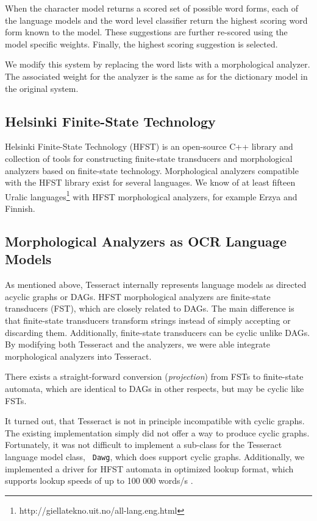 \documentclass[b5paper]{article}
\begin{document}
When the character model returns a scored set of possible word forms,
each of the language models and the word level classifier return the
highest scoring word form known to the model. These suggestions are
further re-scored using the model specific weights. Finally, the highest
scoring suggestion is selected.

We modify this system by replacing the word lists with a morphological
analyzer. The associated weight for the analyzer is the same as for
the dictionary model in the original system.

\subsection{Helsinki Finite-State Technology}
Helsinki Finite-State Technology (HFST) \cite{linden13} is an
open-source C++ library and collection of tools for constructing
finite-state transducers and morphological analyzers based on
finite-state technology. Morphological analyzers compatible with the
HFST library exist for several languages. We know of at least fifteen
Uralic languages\footnote{http://giellatekno.uit.no/all-lang.eng.html}
with HFST morphological analyzers, for example Erzya and Finnish.

\subsection{Morphological Analyzers as OCR Language Models}
As mentioned above, Tesseract internally represents language models as
directed acyclic graphs or DAGs. HFST morphological analyzers are
finite-state transducers (FST), which are closely related to DAGs. The
main difference is that finite-state transducers transform strings
instead of simply accepting or discarding them. Additionally,
finite-state transducers can be cyclic unlike DAGs. By modifying both
Tesseract and the analyzers, we were able integrate morphological
analyzers into Tesseract.

There exists a straight-forward conversion ({\it projection})
from FSTs to finite-state automata, which are identical to DAGs in
other respects, but may be cyclic like FSTs. 

It turned out, that Tesseract is not in principle incompatible with
cyclic graphs. The existing implementation simply did not offer a way
to produce cyclic graphs. Fortunately, it was not difficult to
implement a sub-class for the Tesseract language model class, {\tt
  Dawg}, which does support cyclic graphs. Additionally, we implemented a
driver for HFST automata in optimized lookup format, which supports
lookup speeds of up to 100 000 words/s \cite{silfverberg09}.
\end{document}

